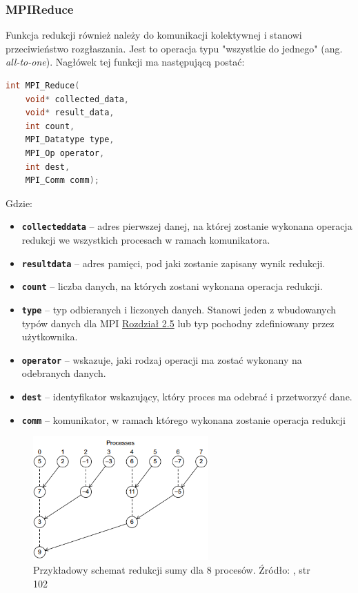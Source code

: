 \subsubsection{MPI\textunderscore Reduce}

Funkcja redukcji również należy do komunikacji kolektywnej i stanowi przeciwieństwo rozgłaszania. Jest to operacja typu "wszystkie do jednego" (ang. \textit{all-to-one}). Nagłówek tej funkcji ma następującą postać:

\begin{lstlisting}[language=C]
int MPI_Reduce(
	void* collected_data,
	void* result_data,
	int count,
	MPI_Datatype type,
	MPI_Op operator,
	int dest,
	MPI_Comm comm);
\end{lstlisting}

Gdzie:

\begin{itemize}
	\item \texttt{\textbf{collected\textunderscore data}} -- adres pierwszej danej, na której zostanie wykonana operacja redukcji we wszystkich procesach w ramach komunikatora.
	\item \texttt{\textbf{result\textunderscore data}} -- adres pamięci, pod jaki zostanie zapisany wynik redukcji.
	\item \texttt{\textbf{count}} -- liczba danych, na których zostani wykonana operacja redukcji.
	\item \texttt{\textbf{type}} --  typ odbieranych i liczonych danych. Stanowi jeden z wbudowanych typów danych dla MPI \hyperref[table:datatypes]{Rozdział 2.5} lub typ pochodny zdefiniowany przez użytkownika.
	\item \texttt{\textbf{operator}} -- wskazuje, jaki rodzaj operacji ma zostać wykonany na odebranych danych.
	\item \texttt{\textbf{dest}} -- identyfikator wskazujący, który proces ma odebrać i przetworzyć dane.
	\item \texttt{\textbf{comm}} -- komunikator, w ramach którego wykonana zostanie operacja redukcji
\end{itemize}

\begin{figure}[h]
	\centering
	\includegraphics[width=0.6\textwidth]{./img/redukcja.png}
	\caption{Przykładowy schemat redukcji sumy dla 8 procesów. Źródło: \cite{Pacheco}, str 102}
	\label{img:sieć}
\end{figure}

